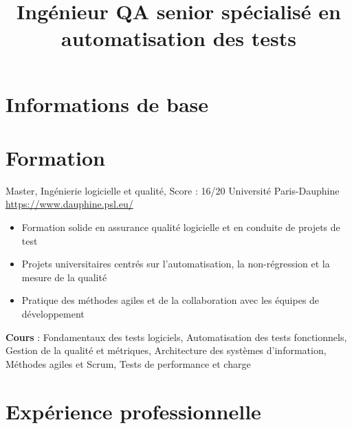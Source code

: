 \documentclass[a4paper, serif, 10pt]{moderncv}
\title{Ingénieur QA senior spécialisé en automatisation des tests}
\begin{document}
\maketitle

\section{Informations de base}

\section{Formation}

        {Master, Ingénierie logicielle et qualité, Score : 16/20}
        {Université Paris-Dauphine}
        {\url{https://www.dauphine.psl.eu/}}
        {}
        {\begin{itemize}
\item Formation solide en assurance qualité logicielle et en conduite de projets de test
\item Projets universitaires centrés sur l'automatisation, la non-régression et la mesure de la qualité
\item Pratique des méthodes agiles et de la collaboration avec les équipes de développement
\end{itemize}
\textbf{Cours} : Fondamentaux des tests logiciels, Automatisation des tests fonctionnels, Gestion de la qualité et métriques, Architecture des systèmes d'information, Méthodes agiles et Scrum, Tests de performance et charge}
\section{Expérience professionnelle}
\end{document}
